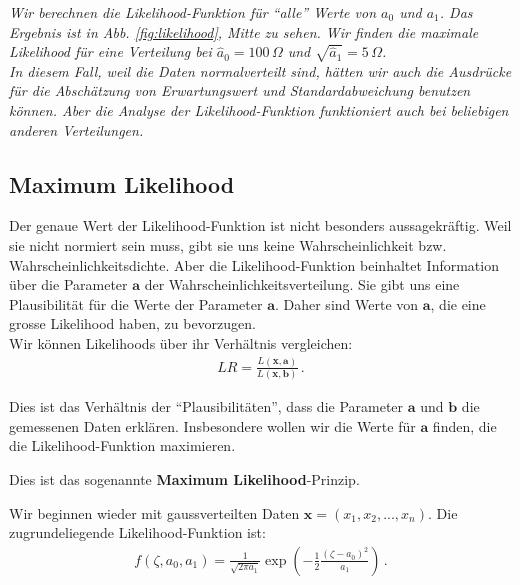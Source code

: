 \textit{Wir berechnen die Likelihood-Funktion f\"ur ``alle'' Werte von $a_0$ und $a_1$. 
Das Ergebnis ist in Abb. \ref{fig:likelihood}, Mitte zu sehen. 
Wir finden die maximale Likelihood f\"ur eine Verteilung bei $\hat{a}_0 = 100\,\Omega$ und $\sqrt{\hat{a}_1} = 5\,\Omega$.\\
In diesem Fall, weil die Daten normalverteilt sind, h\"atten wir auch die Ausdr\"ucke f\"ur die Absch\"atzung von Erwartungswert und Standardabweichung benutzen k\"onnen. Aber die Analyse der Likelihood-Funktion funktioniert auch bei beliebigen anderen Verteilungen.}


\subsection{Maximum Likelihood}
\label{subsec:vl8-2}

Der genaue Wert der Likelihood-Funktion ist nicht besonders aussagekr\"aftig. Weil sie nicht normiert sein muss, gibt sie uns keine Wahrscheinlichkeit bzw. Wahrscheinlichkeitsdichte. Aber die Likelihood-Funktion beinhaltet Information \"uber die Parameter $\boldsymbol{a}$ der Wahrscheinlichkeitsverteilung. Sie gibt uns eine Plausibilität für die Werte der Parameter $\boldsymbol{a}$. Daher sind Werte von $\boldsymbol{a}$, die eine grosse Likelihood haben, zu bevorzugen.\\[0.3cm]
Wir k\"onnen Likelihoods \"uber ihr Verh\"altnis vergleichen:
\begin{align}
LR = \frac{L(\boldsymbol{x,a})}{L(\boldsymbol{x,b})}\,.
\label{eq:vl8-7}
\end{align}

Dies ist das Verh\"altnis der ``Plausibilitäten'', dass die Parameter $\boldsymbol{a}$ und $\boldsymbol{b}$ die gemessenen Daten erkl\"aren. Insbesondere wollen wir die Werte f\"ur $\boldsymbol{a}$ finden, die die Likelihood-Funktion maximieren.

\begin{center}
\begin{tcolorbox}[enhanced,width=6in,drop fuzzy shadow southwest,
    colframe=red!50!black,colback=red!05]
   Dies ist das sogenannte \textbf{Maximum Likelihood}-Prinzip. 
\end{tcolorbox}
\end{center}


Wir beginnen wieder mit gaussverteilten Daten $\boldsymbol{x} = (x_1, x_2, ..., x_n)$. Die zugrundeliegende Likelihood-Funktion ist:
\begin{align}
f(\zeta, a_0, a_1) = \frac{1}{ \sqrt{2 \pi a_1} } \exp \left( - \frac{1}{2} \frac{ (\zeta - a_0)^2 }{ a_1 } \right)\,.
\label{eq:vl8-8}
\end{align}

